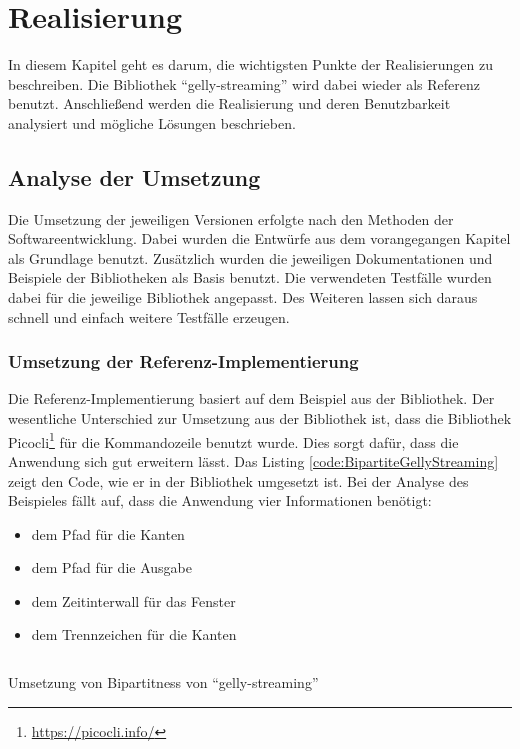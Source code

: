 \chapter{Realisierung}
In diesem Kapitel geht es darum, die wichtigsten Punkte der Realisierungen
zu beschreiben. Die Bibliothek \enquote{gelly-streaming} wird dabei wieder als
Referenz benutzt. Anschließend werden die Realisierung und deren Benutzbarkeit
analysiert und mögliche Lösungen beschrieben.

\section{Analyse der Umsetzung}
Die Umsetzung der jeweiligen Versionen erfolgte nach den Methoden der
Softwareentwicklung. Dabei wurden die Entwürfe aus dem vorangegangen Kapitel
als Grundlage benutzt. Zusätzlich wurden die jeweiligen Dokumentationen und
Beispiele der Bibliotheken als Basis benutzt. Die verwendeten Testfälle wurden
dabei für die jeweilige Bibliothek angepasst. Des Weiteren lassen sich daraus
schnell und einfach weitere Testfälle erzeugen.

\subsection{Umsetzung der Referenz-Implementierung}
Die Referenz-Implementierung basiert auf dem Beispiel aus der Bibliothek. Der
wesentliche Unterschied zur Umsetzung aus der Bibliothek ist, dass die
Bibliothek Picocli\footnote{\url{https://picocli.info/}} für die Kommandozeile
benutzt wurde. Dies sorgt dafür, dass die Anwendung sich gut erweitern lässt.
Das Listing \ref{code:BipartiteGellyStreaming} zeigt den Code, wie er in der
Bibliothek umgesetzt ist. Bei der Analyse des Beispieles fällt auf, dass die
Anwendung vier Informationen benötigt:

\begin{itemize}
    \item dem Pfad für die Kanten
    \item dem Pfad für die Ausgabe
    \item dem Zeitinterwall für das Fenster
    \item dem Trennzeichen für die Kanten
\end{itemize} 

\begin{listing}
    \inputminted[breaklines=true]{java}{../material/code/BipartitenessCheckExample.java}
    \caption{Umsetzung von Bipartitness von \enquote{gelly-streaming} \cite{Kalavri2018}}
    \label{code:BipartiteGellyStreaming}
\end{listing}


